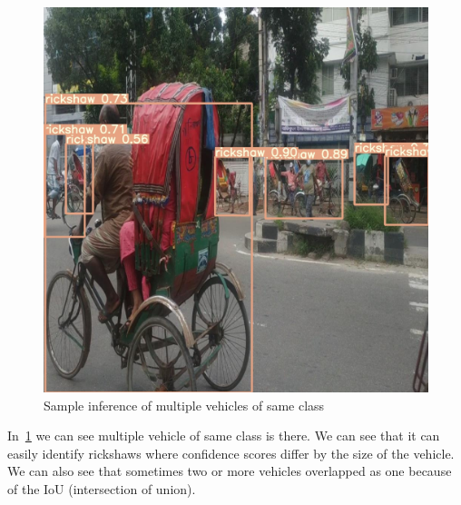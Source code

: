 \begin{figure}[h]
    \centering
    \includegraphics[max width=\textwidth]{images/ours/inference-2.jpg}
   \caption[Sample Inference of Vehicles 2]{Sample inference of multiple vehicles of same class}
    \label{fig:inference43}
\end{figure}

In~\ref{fig:inference43} we can see multiple vehicle of same class is there. We can see that it can easily identify rickshaws where confidence scores differ by the size of the vehicle. We can also see that sometimes two or more vehicles overlapped as one because of the IoU (intersection of union).

\newpage

